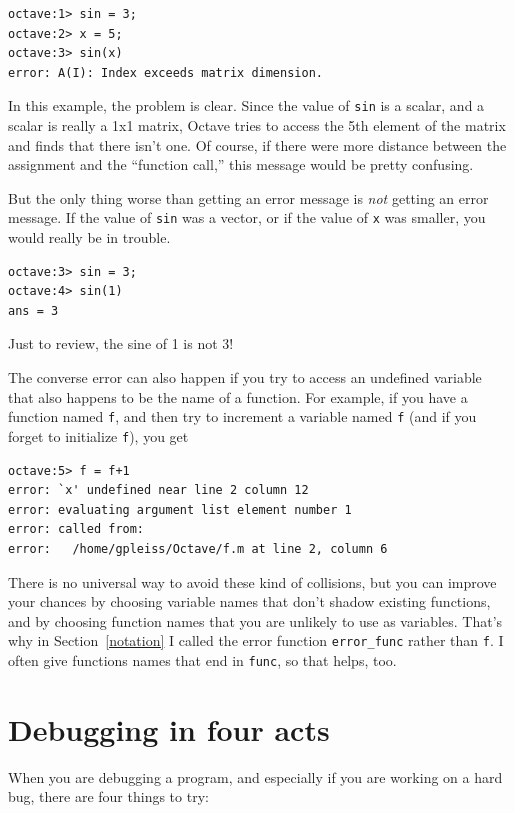\documentclass{book}
\begin{document}
\begin{verbatim}
octave:1> sin = 3;
octave:2> x = 5;
octave:3> sin(x)
error: A(I): Index exceeds matrix dimension.
\end{verbatim}

In this example, the problem is clear. Since the value of {\tt sin}
is a scalar, and a scalar is really a 1x1 matrix, Octave tries to
access the 5th element of the matrix and finds that there isn't one.
Of course, if there were more distance between the assignment
and the ``function call,'' this message would be pretty confusing.

But the only thing worse than getting an error message is {\em not}
getting an error message. If the value of {\tt sin} was a vector,
or if the value of {\tt x} was smaller, you would really
be in trouble.

\begin{verbatim}
octave:3> sin = 3;
octave:4> sin(1)
ans = 3
\end{verbatim}

Just to review, the sine of 1 is not 3!

The converse error can also happen if you try to access an
undefined variable that also happens to be the name of a function.
For example, if you have a function named {\tt f}, and then
try to increment a variable named {\tt f} (and if you forget to
initialize {\tt f}), you get

\begin{verbatim}
octave:5> f = f+1
error: `x' undefined near line 2 column 12
error: evaluating argument list element number 1
error: called from:
error:   /home/gpleiss/Octave/f.m at line 2, column 6
\end{verbatim}

There is no universal way to avoid these kind of
collisions, but you can improve your chances by choosing
variable names that don't shadow existing functions, and by
choosing function names that you are unlikely to use as variables.
That's why in Section~\ref{notation} I called the error function
{\tt error\_func} rather than {\tt f}. I often give functions
names that end in {\tt func}, so that helps, too.


\section{Debugging in four acts}

When you are debugging a program, and especially if you are
working on a hard bug, there are four things to try:
\end{document}
